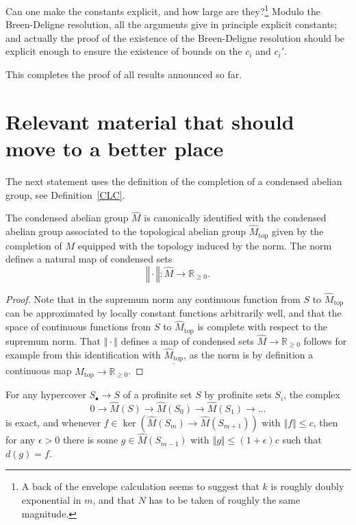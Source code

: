 \begin{question} Can one make the constants explicit, and how large are they?\footnote{A back of the envelope calculation seems to suggest that $k$ is roughly doubly exponential in $m$, and that $N$ has to be taken of roughly the same magnitude.} Modulo the Breen-Deligne resolution, all the arguments give in principle explicit constants; and actually the proof of the existence of the Breen-Deligne resolution should be explicit enough to ensure the existence of bounds on the $c_i$ and $c_i'$.
\end{question}

This completes the proof of all results announced so far.

\section{Relevant material that should move to a better place}



The next statement uses the definition of the completion of a condensed abelian group, see Definition~\ref{CLC}.

\begin{proposition}
  \label{prop:normedcompletion}
The condensed abelian group $\widehat{M}$ is canonically identified with the condensed abelian group associated to the topological abelian group $\widehat{M}_{\mathrm{top}}$ given by the completion of $M$ equipped with the topology induced by the norm. The norm defines a natural map of condensed sets
\[
‖\cdot‖: \widehat{M}\to \mathbb R_{\geq 0}.
\]
\end{proposition}

\begin{proof}
Note that in the supremum norm any continuous function from $S$ to $\widehat{M}_{\mathrm{top}}$ can be approximated by locally constant functions arbitrarily well, and that the space of continuous functions from $S$ to $\widehat{M}_{\mathrm{top}}$ is complete with respect to the supremum norm. That $‖\cdot‖$ defines a map of condensed sets $\widehat{M}\to \mathbb R_{\geq 0}$ follows for example from this identification with $\underline{\widehat{M}_{\mathrm{top}}}$, as the norm is by definition a continuous map $\widehat{M}_{\mathrm{top}}\to \mathbb R_{\geq 0}$.
\end{proof}

\begin{proposition}
  \label{hypercover-exact}
For any hypercover $S_\bullet\to S$ of a profinite set $S$ by profinite sets $S_i$, the complex
\[
0\to \widehat{M}(S)\to \widehat{M}(S_0)\to \widehat{M}(S_1)\to \ldots
\]
is exact, and whenever $f\in \ker(\widehat{M}(S_m)\to \widehat{M}(S_{m+1}))$ with $‖f‖\leq c$, then for any $\epsilon>0$ there is some $g\in \widehat{M}(S_{m-1})$ with $‖g‖\leq (1+\epsilon)c$ such that $d(g)=f$.
\end{proposition}

